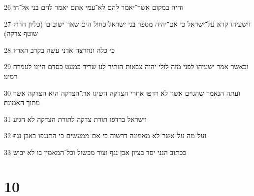 \par 26 והיה במקום אשר־יאמר להם לא־עמי אתם יאמר להם בני אל־חי׃
\par 27 וישעיהו קרא על־ישראל כי אם־יהיה מספר בני ישראל כחול הים שאר ישוב בו (כליון חרוץ שוטף צדקה)׃
\par 28 כי כלה ונחרצה אדני עשה בקרב הארץ׃
\par 29 וכאשר אמר ישעיהו לפני מזה לולי יהוה צבאות הותיר לנו שריד כמעט כסדם היינו לעמרה דמינו׃
\par 30 ועתה הנאמר שהגוים אשר לא רדפו אחרי הצדקה השיגו את־הצדקה היא הצדקה אשר מתוך האמונה׃
\par 31 וישראל ברדפו תורת צדקה לתורת הצדקה לא הגיע׃
\par 32 ועל־מה על־אשר־לא מאמונה דרשוה כי אם־ממעשים כי התנגפו באבן נגף׃
\par 33 ככתוב הנני יסד בציון אבן נגף וצור מכשול וכל־המאמין בו לא יבוש׃

\chapter{10}

